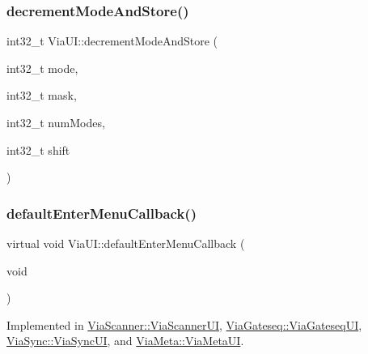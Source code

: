 \mbox{\label{class_via_u_i_a85d24875e904ac7cf63f0762e1ccb3c0}} 
\subsubsection{\texorpdfstring{decrement\+Mode\+And\+Store()}{decrementModeAndStore()}}
{\footnotesize\ttfamily int32\+\_\+t Via\+U\+I\+::decrement\+Mode\+And\+Store (\begin{DoxyParamCaption}\item[{int32\+\_\+t}]{mode,  }\item[{int32\+\_\+t}]{mask,  }\item[{int32\+\_\+t}]{num\+Modes,  }\item[{int32\+\_\+t}]{shift }\end{DoxyParamCaption})}

\mbox{\label{class_via_u_i_a226eb7b65b6035a611dd734d965fa7c2}} 
\subsubsection{\texorpdfstring{default\+Enter\+Menu\+Callback()}{defaultEnterMenuCallback()}}
{\footnotesize\ttfamily virtual void Via\+U\+I\+::default\+Enter\+Menu\+Callback (\begin{DoxyParamCaption}\item[{void}]{ }\end{DoxyParamCaption})\hspace{0.3cm}{\ttfamily [pure virtual]}}



Implemented in \mbox{\hyperlink{class_via_scanner_1_1_via_scanner_u_i_adc8f206d1050c457af29a45cf8050faf}{Via\+Scanner\+::\+Via\+Scanner\+UI}}, \mbox{\hyperlink{class_via_gateseq_1_1_via_gateseq_u_i_ad71d38b0b6b8c29e9f93e0fe6d2c40fc}{Via\+Gateseq\+::\+Via\+Gateseq\+UI}}, \mbox{\hyperlink{class_via_sync_1_1_via_sync_u_i_a53dbd5157906ae81c3d54a56eafbf06e}{Via\+Sync\+::\+Via\+Sync\+UI}}, and \mbox{\hyperlink{class_via_meta_1_1_via_meta_u_i_a632c291b811cf6e704e913060083dd7d}{Via\+Meta\+::\+Via\+Meta\+UI}}.

